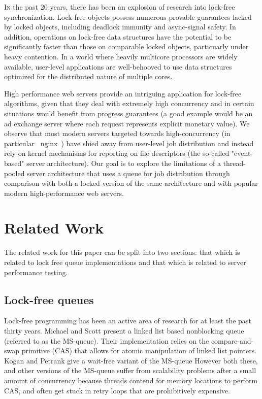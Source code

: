 \documentclass[twoside]{article}
\begin{document}
\begin{multicols}{2}
  \lettrine[nindent=0em,lines=3]{I}n the past 20 years, there has been
  an explosion of research into lock-free synchronization. Lock-free
  objects possess numerous provable guarantees lacked by locked
  objects, including deadlock immunity and async-signal safety. In
  addition, operations on lock-free data structures have the potential
  to be significantly faster than those on comparable locked objects,
  particuarly under heavy contention. In a world where heavily
  multicore processors are widely available, user-level applications
  are well-behooved to use data structures optimized for the
  distributed nature of multiple cores.
  
High performance web servers provide an intriguing application for
  lock-free algorithms, given that they deal with extremely high
  concurrency and in certain situations would benefit from progress
  guarantees (a good example would be an ad exchange server where each
  request represents explicit monetary value). We observe that most
  modern servers targeted towards high-concurrency (in particular
  ~nginx~) have shied away from user-level job distribution and
  instead rely on kernel mechanisms for reporting on file descriptors
  (the so-called "event-based" server architecture). Our goal is to
  explore the limitations of a thread-pooled server architecture that
  uses a queue for job distribution through comparison with both a
  locked version of the same architecture and with popular modern
  high-performance web servers.

\section{Related Work}

The related work for this paper can be split into two sections: that
which is related to lock free queue implementations and that which is
related to server performance testing.

\subsection{Lock-free queues}

Lock-free programming has been an active area of research for at least the
past thirty years. Michael and Scott present a linked list based nonblocking
queue (referred to as the MS-queue). Their implementation relies on the
compare-and-swap primitive (CAS) that allows for atomic manipulation of linked 
list pointers. Kogan and Petrank give a wait-free variant of the MS-queue However both these, and other versions of the MS-queue suffer from scalability
problems after a small amount of concurrency because threads contend for
memory locations to perform CAS, and often get stuck in retry loops that are
prohibitively expensive. 


\end{multicols}
\end{document}
